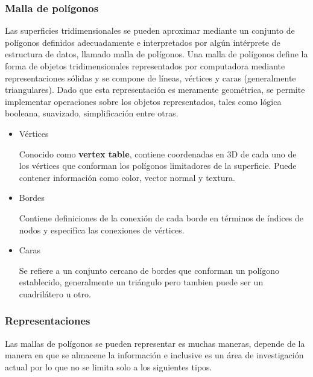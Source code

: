 \documentclass[11pt,letterpaper]{article}     %
\begin{document}
\subsubsection{Malla de pol\' igonos}
Las superficies tridimensionales se pueden aproximar mediante un conjunto de pol\' igonos definidos adecuadamente e interpretados por alg\' un int\' erprete de estructura de datos, llamado malla de pol\' igonos.
Una malla de pol\' igonos define la forma de objetos tridimensionales representados por computadora mediante representaciones s\' olidas y se compone de l\' ineas, v\' ertices y caras (generalmente triangulares). Dado que esta representaci\' on es meramente geom\' etrica, se permite implementar operaciones sobre los objetos representados, tales como l\' ogica booleana, suavizado, simplificaci\' on entre otras.


\begin{itemize}
\item V\' ertices

Conocido como \textbf{vertex table}, contiene coordenadas en 3D de cada uno de los v\' ertices que conforman los pol\' igonos limitadores de la superficie. 
Puede contener informaci\' on como color, vector normal y textura.

\item Bordes

Contiene definiciones de la conexi\' on de cada borde en t\' erminos de \' indices de nodos y especif\' ica las conexiones de v\' ertices.

\item Caras

Se refiere a un conjunto cercano de bordes que conforman un pol\' igono establecido, generalmente un tri\' angulo pero tambien puede ser un cuadril\' atero u otro.
\end{itemize}
\subsubsection{Representaciones}
Las mallas de pol\' igonos se pueden representar es muchas maneras, depende de la manera en que se almacene la informaci\' on e inclusive es un \' area de investigaci\' on actual por lo que no se limita solo a los siguientes tipos.
\end{document}

